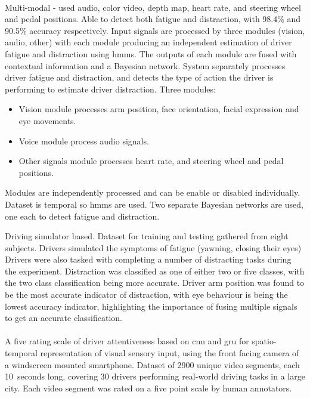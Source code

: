 \documentclass[11pt, parskip=half*,twoside=false]{scrbook}
\begin{document}
\paragraph{\citet{crayeMultiModalDriverFatigue2016}} Multi-modal - used audio, color video, depth map, heart rate, and steering wheel and pedal positions. Able to detect both fatigue and distraction, with 98.4\% and 90.5\% accuracy respectively. Input signals are processed by three modules (vision, audio, other) with each module producing an independent estimation of driver fatigue and distraction using \glspl{hmm}. The outputs of each module are fused with contextual information and a Bayesian network. System separately processes driver fatigue and distraction, and detects the type of action the driver is performing to estimate driver distraction.  Three modules: 
\begin{itemize}
	\item Vision module processes arm position, face orientation, facial expression and eye movements.
	\item Voice module process audio signals.
	\item Other signals module processes heart rate, and steering wheel and pedal positions.
\end{itemize}
Modules are independently processed and can be enable or disabled individually. Dataset is temporal so \glspl{hmm} are used. Two separate Bayesian networks are used, one each to detect fatigue and distraction.

Driving simulator based. Dataset for training and testing gathered from eight subjects. Drivers simulated the symptoms of fatigue (yawning, closing their eyes) Drivers were also tasked with completing a number of distracting tasks during the experiment. Distraction was classified as one of either two or five classes, with the two class classification being more accurate. Driver arm position was found to be the most accurate indicator of distraction, with eye behaviour is being the lowest accuracy indicator, highlighting the importance of fusing multiple signals to get an accurate classification. 

\paragraph{\citet{duaAutoRateHowAttentive2019}}  A five rating scale of driver attentiveness based on \gls{cnn} and \gls{gru} for spatio-temporal representation of visual sensory input, using the front facing camera of a windscreen mounted smartphone. Dataset of 2900 unique video segments, each 10~seconds long, covering 30 drivers performing real-world driving tasks in a large city. Each video segment was rated on a five point scale by human annotators. 
\end{document}
